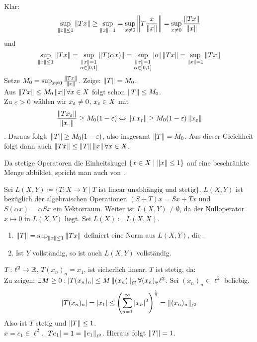 \begin{beweis}
	Klar:
	\[ \sup_{\left\|x\right\|\leq 1}\left\|Tx\right\|\geq\sup_{\left\|x\right\|=1}=\sup_{x\neq 0}\left\|T\frac{x}{\left\|x\right\|}\right\|=\sup_{x\neq 0}\frac{\left\|Tx\right\|}{\left\|x\right\|} \]
	und
	\[ \sup_{\left\|x\right\|\leq 1}\left\|Tx\right\|=\sup_{\substack{\left\|x\right\|=1\\\alpha\in]0,1]}}\left\|T(\alpha x)\right\|=\sup_{\substack{\left\|x\right\|=1\\\alpha\in]0,1]}}|\alpha|\left\|Tx\right\|=\sup_{\left\|x\right\|=1}\left\|Tx\right\| \]
	Setze $ M_0=\sup_{x\neq 0}\frac{\left\|Tx\right\|}{\left\|x\right\|} $. Zeige: $ \left\|T\right\|=M_0 $.\\
	Aus $ \left\|Tx\right\|\leq M_0\left\|x\right\|\forall x\in X $ folgt schon $ \left\|T\right\|\leq M_0 $.\\
	Zu $ \varepsilon>0 $ w\"ahlen wir $ x_\varepsilon\neq 0 $, $ x_\varepsilon\in X $ mit \[ \frac{\left\|Tx_\varepsilon\right\|}{\left\|x_\varepsilon\right\|}\geq M_0(1-\varepsilon) \Leftrightarrow\left\|Tx_\varepsilon\right\|\geq M_0(1-\varepsilon)\left\|x_\varepsilon\right\| \]. Daraus folgt: $ \left\|T\right\|\geq M_0(1-\varepsilon) $, also insgesamt $ \left\|T\right\|=M_0 $. Aus dieser Gleichheit folgt dann auch $ \left\|Tx\right\|\leq\left\|T\right\|\left\|x\right\|\forall x\in X $.
\end{beweis}
\begin{bemerkung*}
	Da stetige Operatoren die Einheitskugel $ \lbrace x\in X\mid\left\|x\right\|\leq 1\rbrace $ auf eine beschr\"ankte Menge abbildet, spricht man auch von .
\end{bemerkung*}
Sei $ L(X,Y)\coloneqq\lbrace T\colon X\rightarrow Y \mid T\text{ ist linear unabh\"angig und stetig}\rbrace$. $ L(X,Y) $ ist bez\"uglich der algebraischen Operationen $ (S+T)x=Sx+Tx $ und $ S(\alpha x)=\alpha Sx $ ein Vektorraum. Weiter ist $ L(X,Y)\neq\emptyset $, da der Nulloperator $ x\mapsto 0 $ in $ L(X,Y) $ liegt. Sei $ L(X)\coloneqq L(X,X) $.\\
\begin{satz}
	\bullshit
	\begin{enumerate}
		\item $ \left\|T\right\|=\sup_{\left\|x\right\|\leq 1}\left\|Tx\right\| $ definiert eine Norm aus $ L(X,Y) $, die .
		\item Ist $ Y $ vollst\"andig, so ist auch $ L(X,Y) $ vollst\"andig.
	\end{enumerate}
\end{satz}
\begin{beispiel*}
	$ T\colon\ell^2\rightarrow\mathbb{R} $, $ T(x_n)_n=x_1 $, ist sicherlich linear. $ T $ ist stetig, da:\\
	Zu zeigen: $ \exists M\geq 0:|T(x_n)_n|\leq M\left\|(x_n)\right\|_{\ell^2}\forall (x_n)_\in\ell^2 $. Sei $ (x_n)_n\in\ell^2 $ beliebig. 
	\[ |T(x_n)_n|=|x_1|\leq\left(\sum_{n=1}^{\infty}|x_n|^2\right)^\frac{1}{2}=\left\|(x_n)_n\right\|_{\ell^2} \]
	Also ist $ T $ stetig und $ \left\|T\right\|\leq 1 $.\\
	$ x=e_1\in\ell^2 $. $ |Te_1|=1=\left\|e_1\right\|_{\ell^2} $. Hieraus folgt $ \left\|T\right\|=1 $.
\end{beispiel*}

